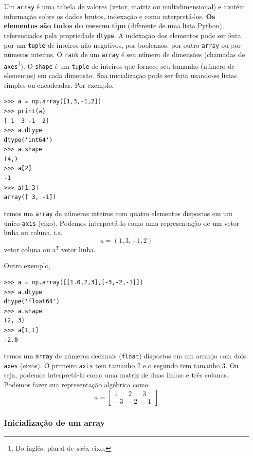 \documentclass[12pt]{article}
\begin{document}
Um \lstinline+array+ é uma tabela de valores (vetor, matriz ou multidimensional) e contém informação sobre os dados brutos, indexação e como interpretá-los. {\bf Os elementos são todos do mesmo tipo} (diferente de uma lista Python), referenciados pela propriedade \lstinline+dtype+. A indexação dos elementos pode ser feita por um \lstinline+tuple+ de inteiros não negativos, por booleanos, por outro \lstinline+array+ ou por números inteiros. O \lstinline+rank+ de um \lstinline+array+ é seu número de dimensões (chamadas de \lstinline+axes+\footnote{Do inglês, plural de {\it axis}, eixo.}). O \lstinline+shape+ é um \lstinline+tuple+ de inteiros que fornece seu tamanho (número de elementos) em cada dimensão. Sua inicialização pode ser feita usando-se listas simples ou encadeadas. Por exemplo,
\begin{lstlisting}
>>> a = np.array([1,3,-1,2])
>>> print(a)
[ 1  3 -1  2]
>>> a.dtype
dtype('int64')
>>> a.shape
(4,)
>>> a[2]
-1
>>> a[1:3]
array([ 3, -1])
\end{lstlisting}
temos um \lstinline+array+ de números inteiros com quatro elementos dispostos em um único \lstinline+axis+ (eixo). Podemos interpretá-lo como uma representação de um vetor linha ou coluna, i.e.
\begin{equation}
  a = (1, 3, -1, 2)
\end{equation}
vetor coluna ou $a^T$ vetor linha.

Outro exemplo,
\begin{lstlisting}
>>> a = np.array([[1.0,2,3],[-3,-2,-1]])
>>> a.dtype
dtype('float64')
>>> a.shape
(2, 3)
>>> a[1,1]
-2.0
\end{lstlisting}
temos um \lstinline+array+ de números decimais (\lstinline+float+) dispostos em um arranjo com dois \lstinline+axes+ (eixos). O primeiro \lstinline+axis+ tem tamanho $2$ e o segundo tem tamanho $3$. Ou seja, podemos interpretá-lo como uma matriz de duas linhas e três colunas. Podemos fazer sua representação algébrica como
\begin{equation}
  a =
  \begin{bmatrix}
    1 & 2 & 3\\
    -3 & -2 & -1 
  \end{bmatrix}
\end{equation}

\subsubsection{Inicialização de um array}\label{subsubsection:iniarray}
\end{document}
